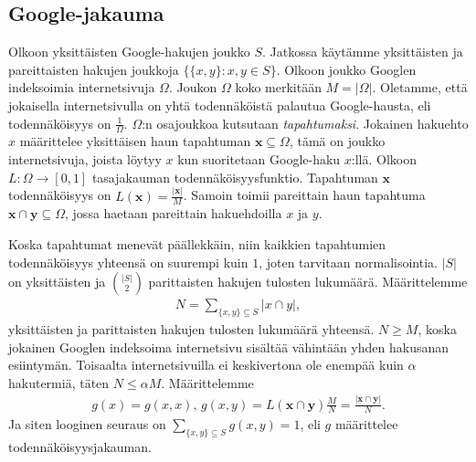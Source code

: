 \documentclass[12pt,finnish,final]{tktltiki2}
\theoremstyle{definition}
\theoremstyle{remark}
\begin{document}
    \subsection{Google-jakauma} %
    \label{sub:google_jakauma}
      Olkoon yksittäisten Google-hakujen joukko $S$.
      Jatkossa käytämme yksittäisten ja pareittaisten hakujen joukkoja $\{\{x,y\}:x,y \in S\}$.
      Olkoon joukko Googlen indeksoimia internetsivuja $\Omega$.
      Joukon $\Omega$ koko merkitään $M = |\Omega|$.
      Oletamme, että jokaisella internetsivulla on yhtä todennäköistä palautua Google-hausta, eli todennäköisyys on $\frac{1}{\Omega}$.
      $\Omega$:n osajoukkoa kutsutaan \emph{tapahtumaksi}.
      Jokainen hakuehto $x$ määrittelee yksittäisen haun tapahtuman $\mathbf{x}\subseteq \Omega$, tämä on joukko internetsivuja, joista löytyy $x$ kun suoritetaan Google-haku $x$:llä.
      Olkoon $L: \Omega \rightarrow [0,1]$ tasajakauman todennäköisyysfunktio.
      Tapahtuman $\mathbf{x}$ todennäköisyys on $L(\mathbf{x}) = \frac{|\mathbf{x}|}{M}$.
      Samoin toimii pareittain haun tapahtuma $\mathbf{x}\cap\mathbf{y}\subseteq\Omega$, jossa haetaan pareittain hakuehdoilla $x$ ja $y$.

      Koska tapahtumat menevät päällekkäin, niin kaikkien tapahtumien todennäköisyys yhteensä on suurempi kuin $1$, joten tarvitaan normalisointia.
      $|S|$ on yksittäisten ja $\binom{|S|}{2}$ parittaisten hakujen tulosten lukumäärä.
      Määrittelemme
      \begin{align}
        N = \sum_{\{x,y\} \subseteq S} |x \cap y|,
      \end{align}
      yksittäisten ja parittaisten hakujen tulosten lukumäärä yhteensä.
      $N \geq M$, koska jokainen Googlen indeksoima internetsivu sisältää vähintään yhden hakusanan esiintymän. Toisaalta internetsivuilla ei keskivertona ole enempää kuin $\alpha$ hakutermiä, täten $N \leq \alpha{}M$.
      Määrittelemme
      \begin{align}
        g(x) = g(x,x),\, g(x,y) = L(\mathbf{x} \cap \mathbf{y})\frac{M}{N} = \frac{|\mathbf{x}\cap \mathbf{y}|}{N}.
      \end{align}
      Ja siten looginen seuraus on $\sum_{\{x,y\}\subseteq S} g(x,y) = 1$, eli $g$ määrittelee todennäköisyysjakauman.
\end{document}
